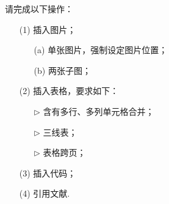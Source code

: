 \documentclass{assignment}
\begin{document}
\begin{pf}
\begin{itemize}
        \end{itemize}
    \end{pf}

    \clearpage
    \begin{prob}
        请完成以下操作：
        \begin{itemize}
            \item[(1)] 插入图片；
            \begin{itemize}
                \item[(a)] 单张图片，强制设定图片位置；
                \item[(b)] 两张子图；
            \end{itemize}
            \item[(2)] 插入表格，要求如下：
            \begin{itemize}
                \item[$\triangleright$] 含有多行、多列单元格合并；
                \item[$\triangleright$] 三线表；
                \item[$\triangleright$] 表格跨页；
            \end{itemize}
            \item[(3)] 插入代码；
            \item[(4)] 引用文献.
        \end{itemize}
    \end{prob}
\end{document}
